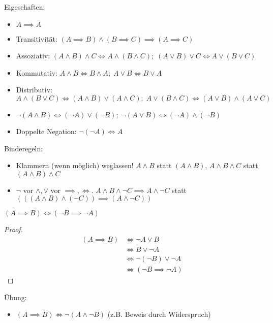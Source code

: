 \begin{theorem}
  Eigeschaften:
  \begin{itemize}
  \item $A \implies A$
  \item Transitivität: $(A \implies B) \wedge (B \implies C) \implies (A \implies C)$
  \item Assoziativ: $(A \wedge B) \wedge C \iff A \wedge (B \wedge C);\; (A \vee B) \vee C \iff A \vee (B \vee C)$
  \item Kommutativ: $A \wedge B \iff B \wedge A;\; A \vee B \iff B \vee A$
  \item Distributiv: $A \wedge (B \vee C) \iff (A \wedge B) \vee (A \wedge C);\; A \vee (B \wedge C) \iff (A \vee B) \wedge (A \vee C)$
  \item $\neg (A \wedge B) \iff (\neg A) \vee (\neg B);\; \neg (A \vee B) \iff (\neg A) \wedge (\neg B)$
  \item Doppelte Negation: $\neg (\neg A) \iff A$
  \end{itemize}
\end{theorem}

\begin{remark}Binderegeln:
  \begin{itemize}
  \item Klammern (wenn möglich) weglassen! $A \wedge B$ statt $(A \wedge B)$, $A \wedge B \wedge C$ statt $(A \wedge B) \wedge C$
  \item $\neg$ vor $\wedge, \vee$ vor $\implies, \iff$. $A \wedge B \wedge \neg C \implies A \wedge \neg C$ statt $(((A \wedge B) \wedge (\neg C)) \implies (A \wedge \neg C))$
  \end{itemize}
\end{remark}

\begin{corollary}[Kontraposition]
  $(A \implies B) \iff (\neg B \implies \neg A)$
\end{corollary}
\begin{proof}
  \begin{align*}
    (A \implies B) &\iff \neg A \vee B \\
    \, &\iff B \vee \neg A \\
    \, &\iff \neg (\neg B) \vee \neg A \\
    \, &\iff (\neg B \implies \neg A)
  \end{align*}
\end{proof}

Übung:
\begin{itemize}
\item $(A \implies B) \iff \neg(A \wedge \neg B)$ (z.B. Beweis durch Widerspruch)
\end{itemize}

